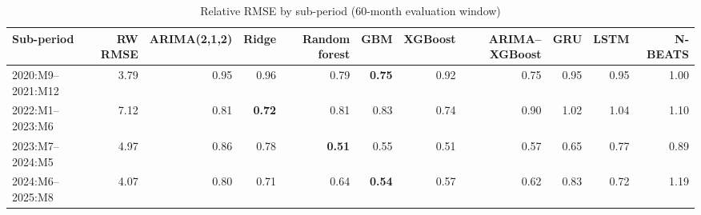 \begin{table}[!ht]\centering\small\caption{Relative RMSE by sub-period (60-month evaluation window)}\label{tab:sub}
\begin{tabular}{l rrrrrrrrrr}\toprule
Sub-period & RW RMSE & ARIMA(2,1,2) & Ridge & Random forest & GBM & XGBoost & ARIMA--XGBoost & GRU & LSTM & N-BEATS\\\midrule
2020:M9--2021:M12 & 3.79 & 0.95 & 0.96 & 0.79 & \textbf{0.75} & 0.92 & 0.75 & 0.95 & 0.95 & 1.00\\
2022:M1--2023:M6 & 7.12 & 0.81 & \textbf{0.72} & 0.81 & 0.83 & 0.74 & 0.90 & 1.02 & 1.04 & 1.10\\
2023:M7--2024:M5 & 4.97 & 0.86 & 0.78 & \textbf{0.51} & 0.55 & 0.51 & 0.57 & 0.65 & 0.77 & 0.89\\
2024:M6--2025:M8 & 4.07 & 0.80 & 0.71 & 0.64 & \textbf{0.54} & 0.57 & 0.62 & 0.83 & 0.72 & 1.19\\
\bottomrule\end{tabular}\end{table}